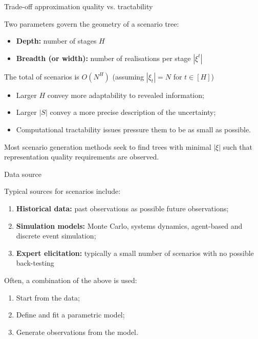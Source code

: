 \begin{frame}{Trade-off approximation quality vs. tractability}

	Two parameters govern the geometry of a scenario tree:
	\vspace{-6pt}
	\begin{itemize}
		\item {\bf Depth:} number of stages $H$
		\item {\bf Breadth (or width):} number of realisations per stage $|\xi^t|$
	\end{itemize}
	
	\pause
	The \alert{total of scenarios} is $O(N^{H})$ (assuming $|\xi_t| = N$ for $t \in [H]$)
	\vspace{-6pt}
	\begin{itemize}
		\item Larger $H$ convey more \alert{adaptability} to revealed information;
		\item Larger $|S|$ convey a more \alert{precise} description of the uncertainty;
		\item \alert{Computational tractability} issues pressure them to be as small as possible.
	\end{itemize}

	Most scenario generation methods seek to find trees with \alert{minimal $|\xi|$} such that \alert{representation quality} requirements are observed.
	
\end{frame}


\begin{frame}{Data source}

	Typical \alert{sources} for scenarios include:
	\vspace{-6pt}
	\begin{enumerate}
		\item {\bf Historical data:} past observations as possible future observations;
		\item {\bf Simulation models:} Monte Carlo, systems dynamics, agent-based and discrete event simulation;
		\item {\bf Expert elicitation:} typically a small number of scenarios with no possible back-testing 
	\end{enumerate}
	
	\pause
	Often, a \alert{combination} of the above is used:
	\vspace{-6pt}
	\begin{enumerate}
		\item Start from the \alert{data};
		\item Define and fit a \alert{parametric model};
		\item Generate \alert{observations} from the model.	
	\end{enumerate}
	
\end{frame}


